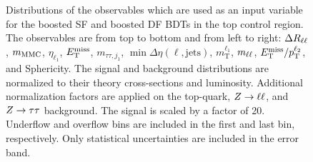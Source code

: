 \begin{figure}[htb]
\begin{subfigure}[t]{0.3\textwidth}
    \end{subfigure}
    \caption{Distributions of the observables which are used as an input variable for the boosted SF and boosted DF BDTs in the top control region.
             The observables are from top to bottom and from left to right: $\Delta R_{\ell\ell}$, $m_\text{MMC}$, $\eta_{\ell_1}$, $E_\text{T}^\text{miss}$, $m_{\tau\tau,j_{1}}$,
             $\min \Delta \eta (\ell, \text{jets})$, $m_\text{T}^{\ell_1}$, $m_{\ell\ell}$, $E_\text{T}^\text{miss} / p_\text{T}^{\ell_2}$, and Sphericity.
             The signal and background distributions are normalized to their theory cross-sections and luminosity.
             Additional normalization factors are applied on the top-quark, $Z \to \ell \ell$, and $Z \to \tau \tau$ background.
             The signal is scaled by a factor of 20.
             Underflow and overflow bins are included in the first and last bin, respectively.
             Only statistical uncertainties are included in the error band.}\label{fig:mva:modeling:cr:boosttop}
\end{figure}

